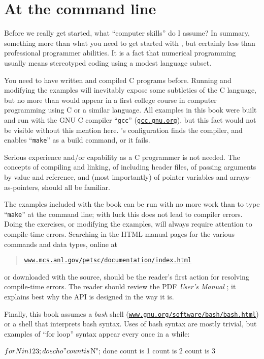 \section{At the command line}

Before we really get started, what ``computer skills'' do I assume?  In summary, something more than what you need to get started with \Matlab, but certainly less than professional programmer abilities.  It is a fact that numerical programming usually means stereotyped coding using a modest language subset.

You need to have written and compiled C programs before.   Running and modifying the examples will inevitably expose some subtleties of the C language, but no more than would appear in a first college course in computer programming using C or a similar language.  All examples in this book were built and run with the GNU C compiler ``\texttt{gcc}'' (\href{https://gcc.gnu.org/}{\texttt{gcc.gnu.org}}), but this fact would not be visible without this mention here.  \PETSc's configuration finds the compiler, and enables ``\texttt{make}'' as a build command, or it fails.

Serious experience and/or capability as a C programmer is not needed.  The concepts of compiling and linking, of including header files, of passing arguments by value and reference, and (most importantly) of pointer variables and arrays-as-pointers, should all be familiar.

The examples included with the book can be run with no more work than to type ``\texttt{make}'' at the command line; with luck this does not lead to compiler errors.  Doing the exercises, or modifying the examples, will always require attention to compile-time errors.  Searching in the \PETSc HTML manual pages for the various commands and data types, online at
\begin{quote}
\href{http://www.mcs.anl.gov/petsc/documentation/index.html}{\texttt{www.mcs.anl.gov/petsc/documentation/index.html}}
\end{quote}
or downloaded with the \PETSc source, should be the reader's first action for resolving compile-time errors.  The reader should review the PDF \emph{\PETSc User's Manual} \citep{petsc-user-ref}; it explains best why the API is designed in the way it is.

Finally, this book assumes a \emph{bash} shell (\href{https://www.gnu.org/software/bash/bash.html}{\texttt{www.gnu.org/software/bash/bash.html}}) or a shell that interprets bash syntax.  Uses of bash syntax are mostly trivial, but examples of ``for loop'' syntax appear every once in a while:
\begin{cline}
$ for N in 1 2 3; do echo "count is $N"; done
count is 1
count is 2
count is 3
\end{cline}
